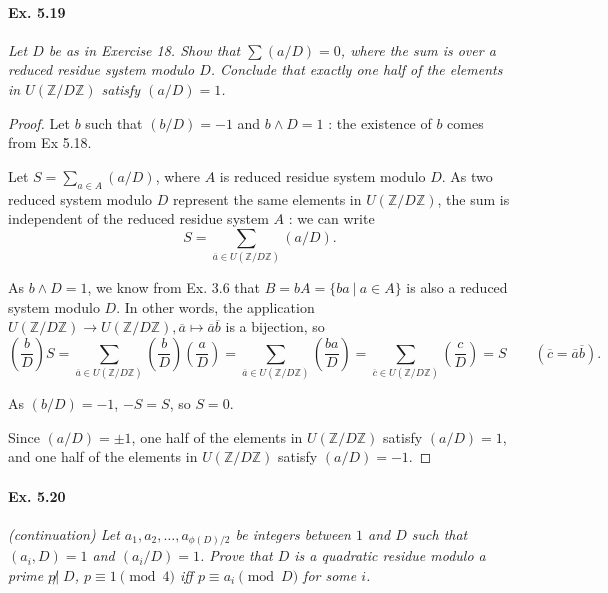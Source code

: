 \documentclass[11pt,a4paper]{article}
\newcommand{\Z}{\mathbb{Z}}
\newcommand{\legendre}[2]{\genfrac{(}{)}{}{}{#1}{#2}}
\begin{document}
\paragraph{Ex. 5.19}

{\it  Let $D$ be as in Exercise 18. Show that $\sum (a/D) = 0$, where the sum is over a reduced residue system modulo $D$. Conclude that exactly one half of the elements in $U(\Z/D\Z)$ satisfy $(a/D) = 1$.
}

\begin{proof}
Let $b$ such that $(b/D) = -1$ and $b \wedge D = 1$ : the existence of $b$ comes from Ex 5.18.

Let $S = \sum_{a\in A} (a/D)$, where $A$ is reduced residue system modulo $D$. As two reduced system modulo $D$ represent the same elements in $U(\Z/D\Z)$, the sum is independent of the  reduced residue system $A$ : we can write $$S = \sum_{\overline{a} \in U(\Z/D\Z)} (a/D).$$

 As $b \wedge D = 1$, we know from Ex. 3.6 that $B = bA = \{ba \ \vert \ a \in A\}$ is also a reduced system modulo $D$. In other words, the application  $U(\Z/D\Z) \to U(\Z/D\Z), \overline{a} \mapsto  \overline{a}\overline{b}$ is a bijection, so
$$\legendre{b}{D} S = \sum_{\overline{a} \in U(\Z/D\Z)} \legendre{b}{D} \legendre{a}{D}  =  \sum_{\overline{a} \in U(\Z/D\Z)} \legendre{ba}{D} = \sum_{\overline{c} \in U(\Z/D\Z)} \legendre{c}{D} = S  \qquad (\overline{c} = \overline{a}\overline{b}).$$


As $(b/D) = -1$, $-S = S $, so $S=0$.

Since $(a/D) = \pm 1$, one half of the elements in $U(\Z/D\Z)$ satisfy $(a/D) = 1$, and one half of the elements in $U(\Z/D\Z)$ satisfy $(a/D) =-1$.
\end{proof}

\paragraph{Ex. 5.20}

{\it (continuation) Let $a_1, a_2, \ldots, a_{\phi(D)/2}$ be integers between $1$ and $D$ such that $(a_i, D) = 1$ and $(a_i/D) = 1$. Prove that $D$ is a quadratic residue modulo a prime $p \not | \; D$, $p \equiv 1 \pmod 4$ iff $p \equiv a_i \pmod D$ for some $i$.
}
\end{document}
